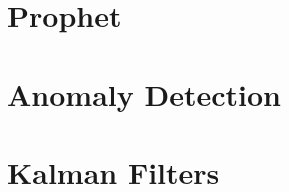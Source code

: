 \section{Prophet}
\label{time_series:prophet}

\section{Anomaly Detection}
\label{time_series:anomaly_detection}


\section{Kalman Filters}
\label{time_series:kalman_filters}
